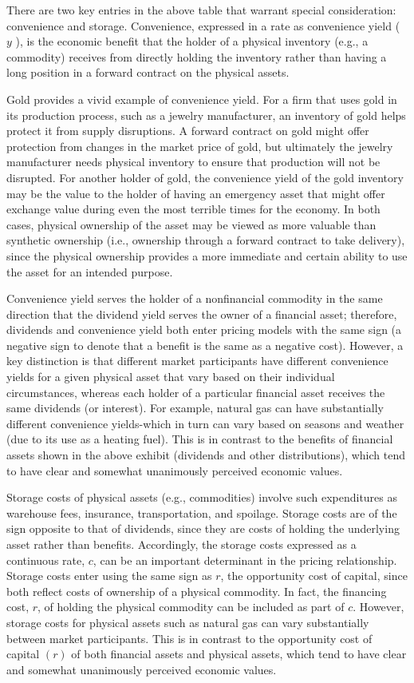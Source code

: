 \documentclass[11pt]{article}
\begin{document}
There are two key entries in the above table that warrant special consideration: convenience and storage. Convenience, expressed in a rate as convenience yield ( $y$ ), is the economic benefit that the holder of a physical inventory (e.g., a commodity) receives from directly holding the inventory rather than having a long position in a forward contract on the physical assets.

Gold provides a vivid example of convenience yield. For a firm that uses gold in its production process, such as a jewelry manufacturer, an inventory of gold helps protect it from supply disruptions. A forward contract on gold might offer protection from changes in the market price of gold, but ultimately the jewelry manufacturer needs physical inventory to ensure that production will not be disrupted. For another holder of gold, the convenience yield of the gold inventory may be the value to the holder of having an emergency asset that might offer exchange value during even the most terrible times for the economy. In both cases, physical ownership of the asset may be viewed as more valuable than synthetic ownership (i.e., ownership through a forward contract to take delivery), since the physical ownership provides a more immediate and certain ability to use the asset for an intended purpose.

Convenience yield serves the holder of a nonfinancial commodity in the same direction that the dividend yield serves the owner of a financial asset; therefore, dividends and convenience yield both enter pricing models with the same sign (a negative sign to denote that a benefit is the same as a negative cost). However, a key distinction is that different market participants have different convenience yields for a given physical asset that vary based on their individual circumstances, whereas each holder of a particular financial asset receives the same dividends (or interest). For example, natural gas can have substantially different convenience yields-which in turn can vary based on seasons and weather (due to its use as a heating fuel). This is in contrast to the benefits of financial assets shown in the above exhibit (dividends and other distributions), which tend to have clear and somewhat unanimously perceived economic values.

Storage costs of physical assets (e.g., commodities) involve such expenditures as warehouse fees, insurance, transportation, and spoilage. Storage costs are of the sign opposite to that of dividends, since they are costs of holding the underlying asset rather than benefits. Accordingly, the storage costs expressed as a continuous rate, $c$, can be an important determinant in the pricing relationship. Storage costs enter using the same sign as $r$, the opportunity cost of capital, since both reflect costs of ownership of a physical commodity. In fact, the financing cost, $r$, of holding the physical commodity can be included as part of $c$. However, storage costs for physical assets such as natural gas can vary substantially between market participants. This is in contrast to the opportunity cost of capital $(r)$ of both financial assets and physical assets, which tend to have clear and somewhat unanimously perceived economic values.
\end{document}
